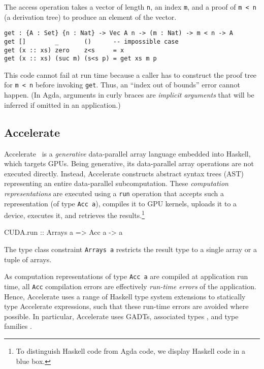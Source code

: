 \documentclass{llncs}
\begin{document}
The access operation takes a vector of length \verb+n+, an index
\verb+m+, and a proof of \verb+m < n+ (a derivation tree) to produce
an element of the vector.  
\begin{verbatim}
get : {A : Set} {n : Nat} -> Vec A n -> (m : Nat) -> m < n -> A
get []        _       ()      -- impossible case
get (x :: xs) zero    z<s     = x
get (x :: xs) (suc m) (s<s p) = get xs m p
\end{verbatim}
This code cannot fail at run time because a caller has to
construct the proof tree for \verb+m < n+ before invoking
\verb+get+. Thus, an ``index out of bounds'' error cannot happen. 
(In Agda, arguments in curly braces are \emph{implicit
  arguments} that will be inferred if omitted in an application.)

\subsection{Accelerate}
\label{sec:accelerate}

Accelerate~\cite{ChakravartyKellerLeeMcdonellGrover2011} is a
\emph{generative} data-parallel array language embedded into Haskell, which targets
GPUs. Being generative, its data-parallel array
operations are not executed directly. Instead, Accelerate constructs abstract
syntax trees (AST) representing an entire data-parallel
subcomputation. These \emph{computation representations} are executed
using a \verb+run+ operation that accepts such a representation (of type
\verb+Acc a+), compiles it to GPU kernels, uploads it to a device,
executes it, and retrieves the results.\footnote{To distinguish
  Haskell code from Agda code, we display Haskell code in a blue box.}
%
\begin{hcode}
CUDA.run :: Arrays a => Acc a -> a
\end{hcode}
%
The type class constraint \verb+Arrays a+ restricts the result type to a single array or a tuple of arrays.

As computation representations of type \verb+Acc a+ are compiled at
application run time, all \verb+Acc+ compilation errors are effectively \emph{run-time errors} of the application. Hence, Accelerate uses a range of Haskell type system extensions to statically type Accelerate expressions, such that these run-time errors are avoided where possible. In particular, Accelerate uses GADTs\cite{PeytonJonesVytiniotisWeirichWashburn2006}, associated types
\cite{ChakravartyKellerJones2005}, and type families
\cite{SchrijversPeytonJonesChakravartySulzmann2008}. 
\end{document}
